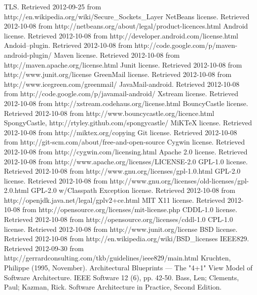\documentclass[12pt]{report}
\begin{document}
\begin{thebibliography}{99}
 TLS. Retrieved 2012-09-25 from http://en.wikipedia.org/wiki/Secure\_Sockets\_Layer
 NetBeans license. Retrieved 2012-10-08 from http://netbeans.org/about/legal/product-licences.html
 Android license. Retrieved 2012-10-08 from http://developer.android.com/license.html
 Andoid--plugin. Retrieved 2012-10-08 from http://code.google.com/p/maven-android-plugin/
 Maven license. Retrieved 2012-10-08 from http://maven.apache.org/license.html
 Junit license. Retrieved 2012-10-08 from http://www.junit.org/license
 GreenMail license. Retrieved 2012-10-08 from http://www.icegreen.com/greenmail/
 JavaMail-android. Retrieved 2012-10-08 from http://code.google.com/p/javamail-android/
 Xstream license. Retrieved 2012-10-08 from http://xstream.codehaus.org/license.html
 BouncyCastle license. Retrieved 2012-10-08 from http://www.bouncycastle.org/licence.html
 SpongyCastle, http://rtyley.github.com/spongycastle/
 MiKTeX license. Retrieved 2012-10-08 from http://miktex.org/copying
 Git license. Retrieved 2012-10-08 from http://git-scm.com/about/free-and-open-source
 Cygwin license. Retrieved 2012-10-08 from http://cygwin.com/licensing.html
 Apache 2.0 license. Retrieved 2012-10-08 from http://www.apache.org/licenses/LICENSE-2.0
 GPL-1.0 license. Retrieved 2012-10-08 from http://www.gnu.org/licenses/gpl-1.0.html
 GPL-2.0 license. Retrieved 2012-10-08 from http://www.gnu.org/licenses/old-licenses/gpl-2.0.html
 GPL-2.0 w/Classpath Exception license. Retrieved 2012-10-08 from http://openjdk.java.net/legal/gplv2+ce.html
 MIT X11 license. Retrieved 2012-10-08 from http://opensource.org/licenses/mit-license.php
 CDDL-1.0 license. Retrieved 2012-10-08 from http://opensource.org/licenses/cddl-1.0
 CPL-1.0 license. Retrieved 2012-10-08 from http://www.junit.org/license
 BSD license. Retrieved 2012-10-08 from http://en.wikipedia.org/wiki/BSD\_licenses
 IEEE829. Retrieved  2012-09-30 from http://gerrardconsulting.com/tkb/guidelines/ieee829/main.html
 Kruchten, Philippe (1995, November). Architectural Blueprints — The "4+1" View Model of Software Architecture. IEEE Software 12 (6), pp. 42-50.
 Bass, Len; Clements, Paul; Kazman, Rick. Software Architecture in Practice, Second Edition.

\end{thebibliography}
\end{document}
